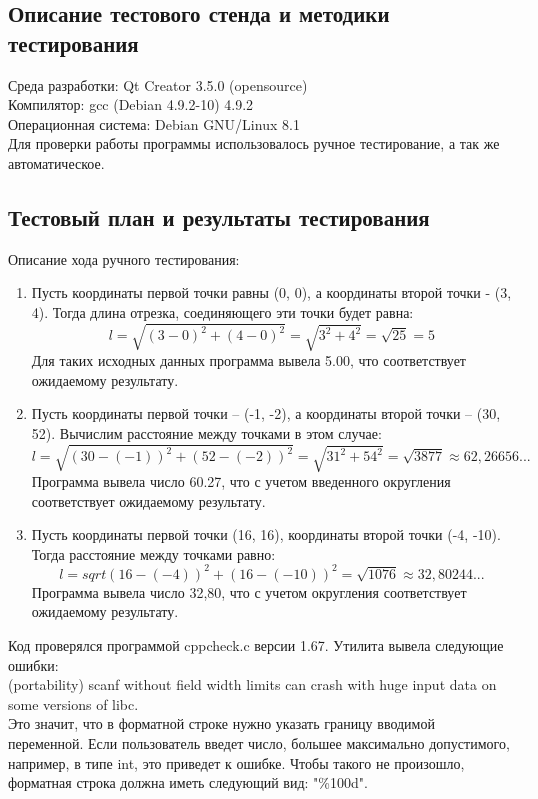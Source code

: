 \documentclass[12pt,a4paper]{report}
\begin{document}
\subsection{Описание тестового стенда и методики тестирования}
Среда разработки: Qt Creator 3.5.0 (opensource) \\
Компилятор: gcc (Debian 4.9.2-10) 4.9.2 \\
Операционная система: Debian GNU/Linux 8.1 \\
Для проверки работы программы использовалось ручное тестирование, а так же автоматическое.
\subsection{Тестовый план и результаты тестирования}
Описание хода ручного тестирования:
\begin{enumerate}
\item
Пусть координаты первой точки равны (0, 0), а координаты второй точки - (3, 4). Тогда длина отрезка, соединяющего эти точки будет равна: 
\begin{equation}
l = \sqrt{(3 - 0) ^ 2 + (4 - 0) ^ 2} = \sqrt{3 ^ 2 + 4 ^ 2} = \sqrt{25} = 5
\end{equation}
Для таких исходных данных программа вывела 5.00, что соответствует ожидаемому результату.
\item 
Пусть координаты первой точки -- (-1, -2), а координаты второй точки -- (30, 52). Вычислим расстояние между точками в этом случае:
\begin{equation}
l = \sqrt{(30 - (-1))^2 + (52 - (-2))^2} = \sqrt{31^2 + 54^2} = \sqrt{3877} \approx 62,26656...
\end{equation}
Программа вывела число 60.27, что с учетом введенного округления соответствует ожидаемому результату.
\item
Пусть координаты первой точки (16, 16), координаты второй точки (-4, -10). Тогда расстояние между точками равно:
\begin{equation}
l = sqrt{(16 - (-4))^2 + (16 - (-10))^2} = \sqrt{1076} \approx 32,80244...
\end{equation}
Программа вывела число 32,80, что с учетом округления соответствует ожидаемому результату. 
\end{enumerate} 

Код проверялся программой cppcheck.c версии 1.67. Утилита вывела следующие ошибки: \\
(portability) scanf without field width limits can crash with huge input data on some versions of libc.\\
Это значит, что в форматной строке нужно указать границу вводимой переменной. Если пользователь введет число, большее максимально допустимого, например, в типе int, это приведет к ошибке. Чтобы такого не произошло, форматная строка должна иметь следующий вид: "\%100d".
\end{document}
